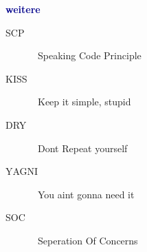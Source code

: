 \textbf{\textcolor{darkblue}{weitere}}~
\begin{description}
	\item[\textsc{S}CP] \ \textcolor{mehrred}{S}peaking Code Principle
	\item[\textsc{K}ISS] \ \textcolor{mehrred}{K}eep it simple, stupid
	\item[\textsc{D}RY] \ \textcolor{mehrred}{D}ont Repeat yourself
	\item[\textsc{Y}AGNI] \ \textcolor{mehrred}{Y}ou aint gonna need it
	\item[\textsc{S}OC] \ \textcolor{mehrred}{S}eperation Of Concerns 
\end{description}
